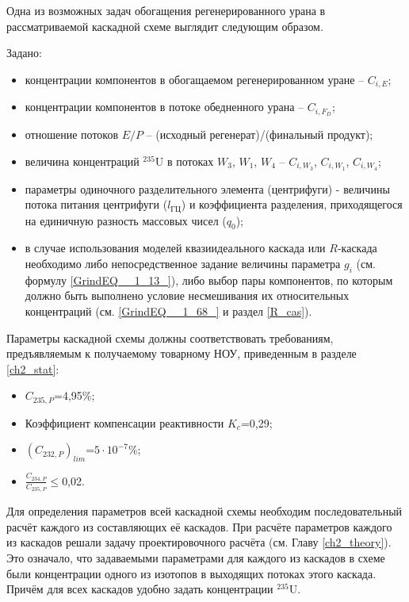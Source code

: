 Одна из возможных задач обогащения регенерированного урана в рассматриваемой каскадной схеме выглядит следующим образом.

Задано:

\begin{itemize}
    \item концентрации компонентов в обогащаемом регенерированном уране -- $C_{i,{E}}$;
    \item концентрации компонентов в потоке обедненного урана -- $C_{i,{F_{D}}}$;
    \item отношение потоков $E/P$ -- (исходный регенерат)/(финальный продукт);
    \item величина концентраций $^{235}$U в потоках $W_{3}$, $W_{1}$, $W_{4}$ -- $C_{i,{W_3}}$, $C_{i,{W_1}}$, $C_{i,{W_4}}$;
    \item параметры одиночного разделительного элемента (центрифуги) - величины потока питания центрифуги ($l_{ГЦ}$) и коэффициента разделения, приходящегося на единичную разность массовых чисел ($q_{0}$);
    \item в случае использования моделей квазиидеального каскада или $R$-каскада необходимо либо непосредственное задание величины параметра $g_i$ (см. формулу \ref{GrindEQ__1_13_}), либо выбор пары компонентов, по которым должно быть выполнено условие несмешивания их относительных концентраций (см. \ref{GrindEQ__1_68_} и раздел \ref{R_cas}).
\end{itemize}

Параметры каскадной схемы должны соответствовать требованиям, предъявляемым к получаемому товарному НОУ, приведенным в разделе \ref{ch2_stat}:

\begin{itemize}
    \item $C_{235,{P}}$=4,95\%;
    \item Коэффициент компенсации реактивности $K_{c}$=0,29;
    \item $(C_{232,{P}})_{lim}$=$5\cdot10^{-7}$\%;
    \item $\frac{C_{234,P}}{C_{235,P}}\le$0,02.
\end{itemize}

Для определения параметров всей каскадной схемы необходим последовательный расчёт каждого из составляющих её каскадов. При расчёте параметров каждого из каскадов решали задачу проектировочного расчёта (см. Главу \ref{ch2_theory}). Это означало, что задаваемыми параметрами для каждого из каскадов в схеме были концентрации одного из изотопов в выходящих потоках этого каскада. Причём для всех каскадов удобно задать концентрации $^{235}$U.

